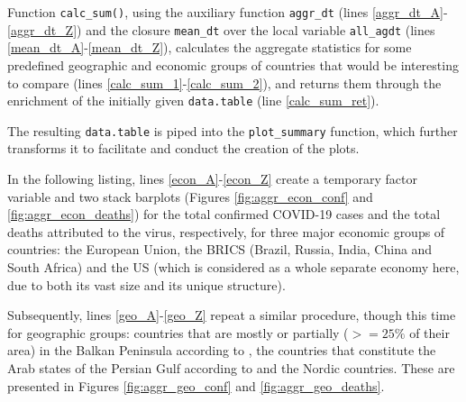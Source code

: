 Function \texttt{calc\_sum()}, using the auxiliary function \texttt{aggr\_dt} (lines \ref{aggr_dt_A}-\ref{aggr_dt_Z}) and the closure \texttt{mean\_dt} over the local variable \texttt{all\_agdt} (lines \ref{mean_dt_A}-\ref{mean_dt_Z}), calculates the aggregate statistics for some predefined geographic and economic groups of countries that would be interesting to compare (lines \ref{calc_sum_1}-\ref{calc_sum_2}), and returns them through the enrichment of the initially given \texttt{data.table} (line \ref{calc_sum_ret}).

The resulting \texttt{data.table} is piped into the \texttt{plot\_summary} function, which further transforms it to facilitate and conduct the creation of the plots.

In the following listing, lines \ref{econ_A}-\ref{econ_Z} create a temporary factor variable and two stack barplots (Figures \ref{fig:aggr_econ_conf} and \ref{fig:aggr_econ_deaths}) for the total confirmed COVID-19 cases and the total deaths attributed to the virus, respectively, for three major economic groups of countries: the European Union, the BRICS (Brazil, Russia, India, China and South Africa) and the US (which is considered as a whole separate economy here, due to both its vast size and its unique structure).

Subsequently, lines \ref{geo_A}-\ref{geo_Z} repeat a similar procedure, though this time for geographic groups: countries that are mostly or partially ($>= 25\%$ of their area) in the Balkan Peninsula according to \cite{wikibalkans}, the countries that constitute the Arab states of the Persian Gulf according to \cite{wikigulf} and the Nordic countries. 
These are presented in Figures \ref{fig:aggr_geo_conf} and \ref{fig:aggr_geo_deaths}.

